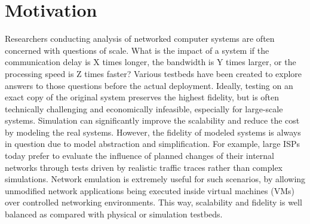 \section{Motivation}
\label{VT:Sec:Motivation}

Researchers conducting analysis of networked computer systems are often concerned with questions of scale.
What is the impact of a system if the communication delay is X times longer, the bandwidth is Y times larger, or the processing speed is Z times faster? 
Various testbeds have been created to explore answers to those questions before the actual deployment.
Ideally, testing on an exact copy of the original system preserves the highest fidelity,
but is often technically challenging and economically infeasible, especially for large-scale systems. 
Simulation can significantly improve the scalability and reduce the cost by modeling the real systems.
However, the fidelity of modeled systems is always in question due to model abstraction and simplification. 
For example, large ISPs today prefer to evaluate the influence of planned changes of their internal networks
through tests driven by realistic traffic traces rather than complex simulations. 
Network emulation is extremely useful for such scenarios, by allowing unmodified network
applications being executed inside virtual machines (VMs) over controlled networking environments.
This way, scalability and fidelity is well balanced as compared with physical or simulation testbeds.

